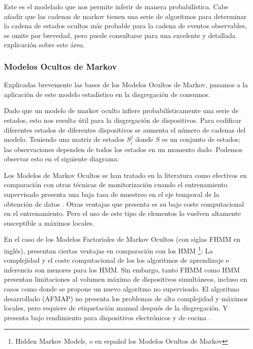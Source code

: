 Este es el modelado que nos permite inferir de manera probabilística.
Cabe añadir que las cadenas de markov tienen una serie de algoritmos para determinar la cadena de estados ocultos más probable para la cadena de eventos observables, se omite por brevedad, pero puede consultarse \autocite{markovStandford} para una excelente y detallada explicación sobre este área.

\subsubsection{Modelos Ocultos de Markov}
Explicadas brevemente las bases de los Modelos Ocultos de Markov, pasamos a la aplicación de este modelo estadístico en la disgregación de consumos. 

Dado que un modelo de markov oculto infiere probabilísticamente una serie de estados, esto nos resulta útil para la disgregación de dispositivos. Para codificar diferentes estados de diferentes dispositivos se aumenta el número de cadenas del modelo. Teniendo una matriz de estados $S_i^j$ donde $S$ es un conjunto de estados; las observaciones dependen de todos los estados en un momento dado. Podemos observar esto en el siguiente diagrama:

Los Modelos de Markov Ocultos se han tratado en la literatura como efectivos en comparación con otras técnicas de monitorización cuando el entrenamiento supervisado presenta una baja tasa de muestreo en el eje temporal de la obtención de datos \autocite{frenchHMMNILM}.
Otras ventajas que presenta es su bajo coste computacional en el entrenamiento. Pero el uso de este tipo de elementos lo vuelven altamente susceptible a máximos locales\autocite{NILMreview2017}.

En el caso de los Modelos Factoriales de Markov Ocultos (con siglas FHMM en inglés), presentan ciertas ventajas en comparación con los HMM \footnote{Hidden Markov Models, o en español los Modelos Ocultos de Markov}:
La complejidad y el coste computacional de los los algoritmos de aprendizaje e inferencia son menores para los HMM. Sin embargo, tanto FHMM como HMM presentan limitaciones al volumen máximo de dispositivos simultáneos, incluso en casos como \autocite{afmap2012} donde se propone un nuevo algoritmo no supervisado. El algoritmo desarrollado (AFMAP) no presenta los problemas de alta complejidad y máximos locales, pero requiere de etiquetación manual después de la disgregación. Y presenta bajo rendimiento para dispositivos electrónicos y de cocina \autocite[5]{NILMreview2017}.

